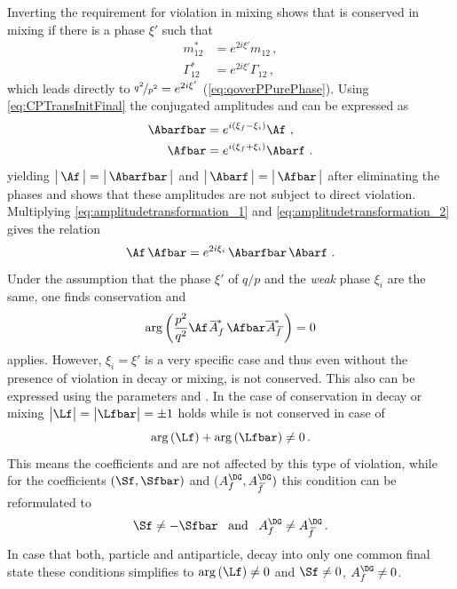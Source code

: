 Inverting the requirement for \CP violation in mixing shows that \CP is conserved in mixing if there is a phase $\xi'$ such that
\begin{equation}
\begin{split}
m_{12}^\ast &= e^{2i\xi'}m_{12}\,,\\
\Gamma_{12}^\ast &= e^{2i\xi'}\Gamma_{12}\,,\label{eq:CPconservationMixing}
\end{split}
\end{equation}
which leads directly to $\nicefrac{q^2}{p^2} = e^{2i\xi'}$ (\cref{eq:qoverPPurePhase}).
Using \cref{eq:CPTransInitFinal} the \CP conjugated amplitudes \Abarfbar and \Afbar can be expressed as
\begin{align}
\Abarfbar&=e^{i\left(\xi_f-\xi_i\right)}\Af\,\,,\label{eq:amplitudetransformation_1}\\
\Afbar&=e^{i\left(\xi_f+\xi_i\right)}\Abarf\,\,.\label{eq:amplitudetransformation_2}
\end{align}
yielding $\big|\,\Af\,\big|=\big|\,\Abarfbar\,\big|$ and $\big|\,\Abarf\,\big|=\big|\,\Afbar\,\big|$ after eliminating the phases and shows that these amplitudes are not subject to direct \CP violation.
Multiplying \cref{eq:amplitudetransformation_1} and \cref{eq:amplitudetransformation_2} gives the relation
\begin{equation}
\Af\,\Afbar=e^{2i\xi_i}\,\Abarfbar\,\Abarf\,\,.
\end{equation}
Under the assumption that the phase $\xi'$ of $q/p$ and the \emph{weak} phase $\xi_i$ are the same, one finds \CP conservation and
\begin{equation}
\arg\left(\frac{p^2}{q^2}\Af \,\overline{\kern -1.0pt A\kern -1.0pt}_{\kern 1.0pt f}^\ast\,\Afbar\overline{\kern -1.0pt \,A\kern -1.0pt}_{\kern 2.5pt\overline{\kern -1.5pt f\kern 1.5pt}}^\ast\right)=0
\end{equation}
applies.
However, $\xi_i=\xi'$ is a very specific case and thus even without the presence of \CP violation in decay or mixing, \CP is not conserved.
This also can be expressed using the parameters \Lf and \Lfbar.
In the case of \CP conservation in decay or mixing $\big|\Lf\big|=\big|\Lfbar\big| = \pm1$ holds while \CP is not conserved in case of
\begin{equation}
	\arg\left(\Lf\right)+\arg\left(\Lfbar\right)\neq0\,. \label{eq:conditionCPV}
\end{equation}
This means the \CP coefficients \Cf and \Cfbar are not affected by this type of \CP violation, while for the coefficients $(\Sf, \Sfbar)$ and  ($A_f^{\DG}, A_{\kern 1.5pt\overline{\kern -1.5pt f\kern 1.5pt}}^{\DG})$ this condition can be reformulated to
\begin{equation}
\Sf\neq-\Sfbar\,\,\,\,\,\text{and}\,\,\,\,\,A_f^{\DG}\neq A_{\kern 1.5pt\overline{\kern -1.5pt f\kern 1.5pt}}^{\DG}\,.\label{eq:condForIntCPV}
\end{equation}
In case that both, particle and antiparticle, decay into only one common final state these conditions simplifies to $\arg\left(\Lf\right)\neq0$ and $\Sf\neq0$, $A_f^{\DG}\neq0$.


